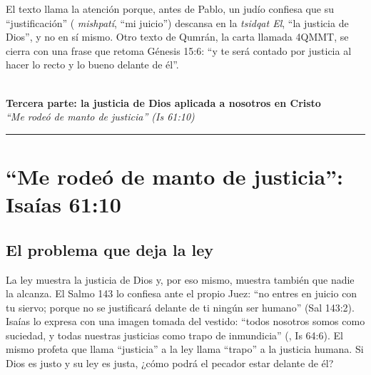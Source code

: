 El texto llama la atención porque, antes de Pablo, un judío confiesa que su ``justificación'' ( \emph{mishpatí}, ``mi juicio'') descansa en la  \emph{tsidqat El}, ``la justicia de Dios'', y no en sí mismo. Otro texto de Qumrán, la carta llamada 4QMMT, se cierra con una frase que retoma Génesis 15:6: ``y te será contado por justicia al hacer lo recto y lo bueno delante de él''.



\begin{center}\vspace{6pt}{\color{dorado}\rule{0.6\linewidth}{1.2pt}}\\[6pt]
{\Large\bfseries\color{azul}Tercera parte: la justicia de Dios aplicada a nosotros en Cristo}\\[3pt]
{\small\itshape\color{gris}``Me rodeó de manto de justicia'' (Is 61:10)}\\[2pt]
{\color{dorado}\rule{0.6\linewidth}{1.2pt}}\vspace{4pt}\end{center}
\section{“Me rodeó de manto de justicia”: Isaías 61:10}\label{sec:manto-justo}

\subsection{El problema que deja la ley}
La ley muestra la justicia de Dios y, por eso mismo, muestra también que nadie la alcanza. El Salmo 143 lo confiesa ante el propio Juez: ``no entres en juicio con tu siervo; porque no se justificará delante de ti ningún ser humano'' (Sal 143:2). Isaías lo expresa con una imagen tomada del vestido: ``todos nosotros somos como suciedad, y todas nuestras justicias como trapo de inmundicia'' (, Is 64:6). El mismo profeta que llama ``justicia'' a la ley llama ``trapo'' a la justicia humana. Si Dios es justo y su ley es justa, ¿cómo podrá el pecador estar delante de él?

